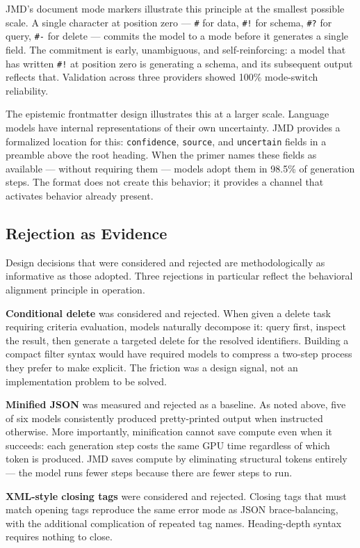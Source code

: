 \documentclass[11pt]{article}
\begin{document}
JMD's document mode markers illustrate this principle at the smallest possible scale. A single character at position zero --- \texttt{\#} for data, \texttt{\#!} for schema, \texttt{\#?} for query, \texttt{\#-} for delete --- commits the model to a mode before it generates a single field. The commitment is early, unambiguous, and self-reinforcing: a model that has written \texttt{\#!} at position zero is generating a schema, and its subsequent output reflects that. Validation across three providers showed 100\% mode-switch reliability.

The epistemic frontmatter design illustrates this at a larger scale. Language models have internal representations of their own uncertainty. JMD provides a formalized location for this: \texttt{confidence}, \texttt{source}, and \texttt{uncertain} fields in a preamble above the root heading. When the primer names these fields as available --- without requiring them --- models adopt them in 98.5\% of generation steps. The format does not create this behavior; it provides a channel that activates behavior already present.

\subsection{Rejection as Evidence}

Design decisions that were considered and rejected are methodologically as informative as those adopted. Three rejections in particular reflect the behavioral alignment principle in operation.

\textbf{Conditional delete} was considered and rejected. When given a delete task requiring criteria evaluation, models naturally decompose it: query first, inspect the result, then generate a targeted delete for the resolved identifiers. Building a compact filter syntax would have required models to compress a two-step process they prefer to make explicit. The friction was a design signal, not an implementation problem to be solved.

\textbf{Minified JSON} was measured and rejected as a baseline. As noted above, five of six models consistently produced pretty-printed output when instructed otherwise. More importantly, minification cannot save compute even when it succeeds: each generation step costs the same GPU time regardless of which token is produced. JMD saves compute by eliminating structural tokens entirely --- the model runs fewer steps because there are fewer steps to run.

\textbf{XML-style closing tags} were considered and rejected. Closing tags that must match opening tags reproduce the same error mode as JSON brace-balancing, with the additional complication of repeated tag names. Heading-depth syntax requires nothing to close.
\end{document}
